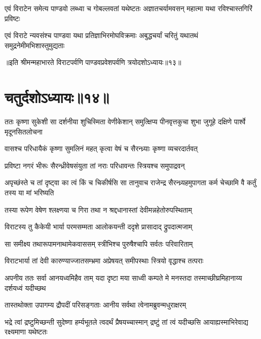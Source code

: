 
\fourlineindentedshloka
{एवं विराटेन समेत्य पाण्डवो}
{लब्ध्वा च गोबल्लवतां यथेष्टतः}
{अज्ञातचर्यामवसन् महात्मा}
{यथा रविश्चास्तगिरिं प्रविष्टः}


\fourlineindentedshloka
{एवं विराटे न्यवसंश्च पाण्डवा}
{यथा प्रतिज्ञाभिरमोघविक्रमाः}
{अबुद्धचर्यां चरितुं यथातथं}
{समुद्रनेमीमभिशास्तुमुद्यताः}

॥इति श्रीमन्महाभारते विराटपर्वणि पाण्डवप्रवेशपर्वणि त्रयोदशोऽध्यायः॥१३॥

\chapter{चतुर्दशोऽध्यायः॥१४॥}

\threelineshloka
{ततः कृष्णा सुकेशी सा दर्शनीया शुचिस्मिता}
{वेणीकेशान् समुत्क्षिप्य पीनवृत्तकुचा शुभा}
{जुगूहे दक्षिणे पार्श्वे मृदूनसितलोचना}


\twolineshloka
{वासश्च परिधायैकं कृष्णा सुमलिनं महत्}
{कृत्वा वेषं च सैरन्ध्र्याः कृष्णा व्यचरदार्तवत्}


\twolineshloka
{प्रविष्टा नगरं भीरूः सैरन्ध्रीवेषसंयुता}
{तां नराः परिधावन्तः स्त्रियश्च समुपाद्रवन्}


\threelineshloka
{अपृच्छंस्ते च तां दृष्ट्वा का त्वं किं च चिकीर्षसि}
{सा तानुवाच राजेन्द्र सैरन्ध्र्यहमुपागता}
{कर्म चेच्छामि वै कर्तुं तस्य या मां भरिष्यति}



\twolineshloka
{तस्या रूपेण वेषेण श्लक्ष्णया च गिरा तथा}
{न श्रद्दधानास्तां देवीमन्नहेतोरुपस्थिताम्}


\twolineshloka
{विराटस्य तु कैकेयी भार्या परमसम्मता}
{आलोकयन्ती ददृशे प्रासादाद् द्रुपदात्मजाम्}


\twolineshloka
{सा समीक्ष्य तथारूपामनाथामेकवाससम्}
{स्त्रीभिश्च पुरुषैश्चापि सर्वतः परिवारिताम्}


\twolineshloka
{विराटभार्या तां देवी कारुण्याज्जातसम्भ्रमा}
{अप्रेषयत् समीपस्थाः स्त्रियो वृद्धाश्च तत्पराः}


\threelineshloka
{अपनीय ततः सर्वा आनयध्वमिहैव ताम्}
{यदा दृष्टा मया साध्वी कम्पते मे मनस्तदा}
{तस्माच्छीघ्रमिहानाय्य दर्शयध्वं यदीच्छथ}


\twolineshloka
{तास्तथोक्ता उपागम्य द्रौपदीं परिसङ्गताः}
{आनीय सर्वथा त्वेनामब्रुवन्मधुराक्षरम्}


\threelineshloka
{भद्रे त्वां द्रष्टुमिच्छन्ती सुदेष्णा हर्म्यभूतले}
{त्वदर्थं प्रैषयच्चास्मान् द्रष्टुं तां त्वं यदीच्छसि}
{आयाह्यस्माभिरेवाद्य रक्ष्यमाणा यथेष्टतः}


